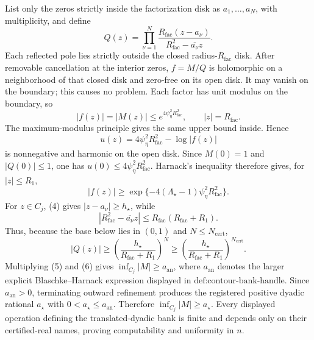 List only the zeros strictly inside the factorization disk as \(a_1,\ldots,a_N\), with multiplicity, and define
\[
 Q(z)=\prod_{\nu=1}^N
 \frac{R_{\mathrm{fac}}(z-a_\nu)}
      {R_{\mathrm{fac}}^2-\overline{a_\nu}z}.
\]
Each reflected pole lies strictly outside the closed radius-\(R_{\mathrm{fac}}\) disk.  After removable cancellation at the interior zeros, \(f=M/Q\) is holomorphic on a neighborhood of that closed disk and zero-free on its open disk.  It may vanish on the boundary; this causes no problem.  Each factor has unit modulus on the boundary, so
\[
 |f(z)|=|M(z)|\le e^{4\psi_{\eta}^2R_{\mathrm{fac}}^2},
 \qquad |z|=R_{\mathrm{fac}}.
\]
The maximum-modulus principle gives the same upper bound inside.  Hence
\[
 u(z)=4\psi_{\eta}^2R_{\mathrm{fac}}^2-\log|f(z)|
\]
is nonnegative and harmonic on the open disk.  Since \(M(0)=1\) and \(|Q(0)|\le1\), one has \(u(0)\le4\psi_{\eta}^2R_{\mathrm{fac}}^2\).  Harnack's inequality therefore gives, for \(|z|\le R_1\),
\[
 |f(z)|\ge
 \exp\{-4(\Lambda_{\star}-1)\psi_{\eta}^2R_{\mathrm{fac}}^2\}. \tag{5}
\]
For \(z\in C_j\), (4) gives \(|z-a_\nu|\ge h_{\star}\), while
\[
 |R_{\mathrm{fac}}^2-\overline{a_\nu}z|
 \le R_{\mathrm{fac}}(R_{\mathrm{fac}}+R_1).
\]
Thus, because the base below lies in \((0,1)\) and \(N\le N_{\mathrm{cert}}\),
\[
 |Q(z)|\ge
 \left(\frac{h_{\star}}{R_{\mathrm{fac}}+R_1}\right)^N
 \ge
 \left(\frac{h_{\star}}{R_{\mathrm{fac}}+R_1}\right)^{N_{\mathrm{cert}}}. \tag{6}
\]
Multiplying (5) and (6) gives \(\inf_{C_j}|M|\ge a_{\mathrm{an}}\), where \(a_{\mathrm{an}}\) denotes the larger explicit Blaschke--Harnack expression displayed in \(\text{def:contour-bank-handle}\).  Since \(a_{\mathrm{an}}>0\), terminating outward refinement produces the registered positive dyadic rational \(a_{\star}\) with \(0<a_{\star}\le a_{\mathrm{an}}\).  Therefore \(\inf_{C_j}|M|\ge a_{\star}\).  Every displayed operation defining the translated-dyadic bank is finite and depends only on their certified-real names, proving computability and uniformity in \(n\).